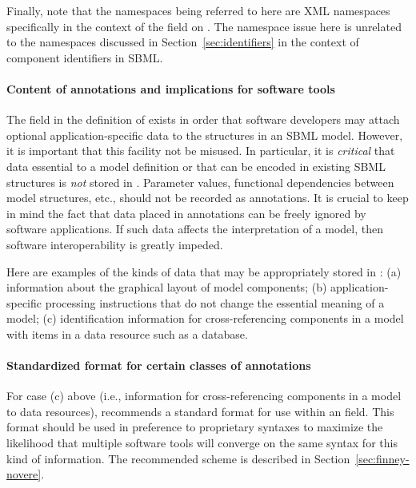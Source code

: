 Finally, note that the namespaces being referred to here are XML
namespaces specifically in the context of the 
field on \SBase.  The namespace issue here is unrelated to the
namespaces discussed in Section~\ref{sec:identifiers} in the
context of component identifiers in SBML.


\paragraph{Content of annotations and implications for software tools}

The  field in the definition of \SBase exists in
order that software developers may attach optional
application-specific data to the structures in an SBML model.
However, it is important that this facility not be misused.  In
particular, it is \emph{critical} that data essential to a model
definition or that can be encoded in existing SBML structures is
\emph{not} stored in . Parameter values,
functional dependencies between model structures, etc., should not
be recorded as annotations.  It is crucial to keep in mind the
fact that data placed in annotations can be freely ignored by
software applications.  If such data affects the interpretation of
a model, then software interoperability is greatly impeded.

Here are examples of the kinds of data that may be appropriately
stored in : (a) information about the graphical
layout of model components; (b) application-specific processing
instructions that do not change the essential meaning of a model;
(c) identification information for cross-referencing components in
a model with items in a data resource such as a database.


\paragraph{Standardized format for certain classes of annotations}

For case (c) above (i.e., information for cross-referencing
components in a model to data resources), \sbmltwotwo recommends a
standard format for use within an  field.  This
format should be used in preference to proprietary syntaxes to
maximize the likelihood that multiple software tools will converge
on the same syntax for this kind of information.  The \sbmltwotwo
recommended scheme is described in
Section~\ref{sec:finney-novere}.


